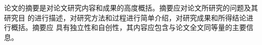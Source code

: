 \begin{cabstract}

论文的摘要是对论文研究内容和成果的高度概括。摘要应对论文所研究的问题及其研究目
的进行描述，对研究方法和过程进行简单介绍，对研究成果和所得结论进行概括。摘要应
具有独立性和自创性，其内容应包含与论文全文同等量的主要信息。


\end{cabstract}


%
%
%

